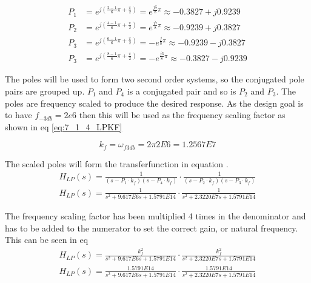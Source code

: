 \begin{equation}\label{eq:7_1_4_LPPoles1} 
    \begin{aligned}
        P_1 &= e^{j\left(\frac{2-1}{6}\pi + \frac{\pi}{2}\right)} = e^{\frac{j5}{8}\pi} \approx -0.3827 + j0.9239 \\
        P_2 &= e^{j\left(\frac{4-1}{6}\pi + \frac{\pi}{2}\right)} = e^{\frac{j7}{8}\pi} \approx -0.9239 + j0.3827 \\
        P_3 &= e^{j\left(\frac{6-1}{6}\pi + \frac{\pi}{2}\right)} = -e^{\frac{j}{8}\pi} \approx -0.9239 - j0.3827  \\
        P_3 &= e^{j\left(\frac{8-1}{6}\pi + \frac{\pi}{2}\right)} = -e^{\frac{j3}{8}\pi}\approx -0.3827 - j0.9239 
    \end{aligned}
\end{equation}

The poles will be used to form two second order systems, so the conjugated pole pairs are grouped up. $P_1$ and $P_4$ is a conjugated pair and so is $P_2$ and $P_3$. The poles are frequency scaled to produce the desired response. As the design goal is to have $f_{-3db} = 2e6$ then this will be used as the frequency scaling factor as shown in eq \ref{eq:7_1_4_LPKF}

\begin{equation}\label{eq:7_1_4_LPKF}
    k_f = \omega_{f3db} = 2\pi 2E6 = 1.2567E7
\end{equation}

The scaled poles will form the transferfunction in equation .
\begin{equation}\label{eq:7_1_4_LPTF}
    \begin{aligned}
    H_{LP}(s) = \frac{1}{(s-P_1\cdot k_f)(s-P_4\cdot k_f)  }\cdot \frac{1}{(s-P_2\cdot k_f)(s-P_3\cdot k_f)}\\
    H_{LP}(s) = \frac{1}{s^2 + 9.617E6s + 1.5791E14}\cdot \frac{1}{s^2 + 2.3220E7s + 1.5791E14}
\end{aligned}
\end{equation}

The frequency scaling factor has been multiplied 4 times in the denominator and has to be added to the numerator to set the correct gain, or natural frequency. This can be seen in eq 
\begin{equation}\label{eq:7_1_4_LPTFKFSQ}
    \begin{aligned}
        H_{LP}(s) = \frac{k_f^2}{s^2 + 9.617E6s + 1.5791E14}\cdot \frac{k_f^2}{s^2 + 2.3220E7s + 1.5791E14}\\
    H_{LP}(s) = \frac{1.5791E14}{s^2 + 9.617E6s + 1.5791E14}\cdot \frac{1.5791E14}{s^2 + 2.3220E7s + 1.5791E14}
\end{aligned}
\end{equation}

